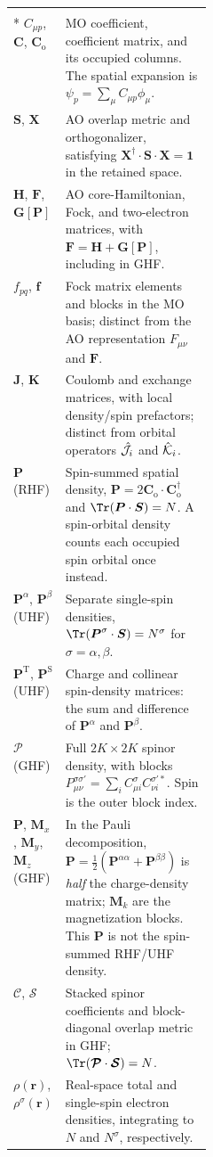 \documentclass[11pt,a4paper,titlepage]{article}
\numberwithin{equation}{section}
\newcommand{\bff}{\boldsymbol{f}}
\newcommand{\br}{\boldsymbol{r}}
\newcommand{\bC}{\boldsymbol{C}}
\newcommand{\bF}{\boldsymbol{F}}
\newcommand{\bG}{\boldsymbol{G}}
\newcommand{\bH}{\boldsymbol{H}}
\newcommand{\bI}{\boldsymbol{1}}
\newcommand{\bJ}{\boldsymbol{J}}
\newcommand{\bK}{\boldsymbol{K}}
\newcommand{\bM}{\boldsymbol{M}}
\newcommand{\bP}{\boldsymbol{P}}
\newcommand{\bS}{\boldsymbol{S}}
\newcommand{\bX}{\boldsymbol{X}}
\newcommand{\chJ}{\Hat{\mathcal{J}}}
\newcommand{\chK}{\Hat{\mathcal{K}}}
\begin{document}
\begin{longtable}{@{}p{0.26\linewidth}p{}@{}}
  \rowcolor{hfGreenLight}
  \multicolumn{2}{@{}l@{}}{\strut\textcolor{hfGreenDark}{\textbf{AO matrices and density normalizations}}}\\*
  $C_{\mu p}$, $\bC$, $\bC_\text{o}$ & MO coefficient, coefficient matrix,
  and its occupied columns. The spatial expansion is
  $\psi_p=\sum_\mu C_{\mu p}\phi_\mu$.\\
  $\bS$, $\bX$ & AO overlap metric and orthogonalizer, satisfying
  $\bX^\dag\cdot\bS\cdot\bX=\bI$ in the retained space.\\
  $\bH$, $\bF$, $\bG[\bP]$ & AO core-Hamiltonian, Fock, and two-electron
  matrices, with $\bF=\bH+\bG[\bP]$, including in GHF.\\
  $f_{pq}$, $\bff$ & Fock matrix elements and blocks in the MO basis;
  distinct from the AO representation $F_{\mu\nu}$ and $\bF$.\\
  $\bJ$, $\bK$ & Coulomb and exchange matrices, with local density/spin
  prefactors; distinct from orbital operators $\chJ_i$ and $\chK_i$.\\
  $\bP$ (RHF) & Spin-summed spatial density,
  $\bP=2\bC_\text{o}\cdot\bC_\text{o}^\dag$ and
  $\Tr(\bP\cdot\bS)=N$. A spin-orbital density counts each occupied
  spin orbital once instead.\\
  $\bP^\alpha$, $\bP^\beta$ (UHF) & Separate single-spin densities,
  $\Tr(\bP^\sigma\cdot\bS)=N^\sigma$ for
  $\sigma=\alpha,\beta$.\\
  $\bP^\text{T}$, $\bP^\text{S}$ (UHF) & Charge and collinear spin-density
  matrices: the sum and difference of $\bP^\alpha$ and $\bP^\beta$.\\
  $\boldsymbol{\mathcal P}$ (GHF) & Full $2K\times2K$ spinor density, with
  blocks $P_{\mu\nu}^{\sigma\sigma'}=\sum_i C_{\mu i}^\sigma
  C_{\nu i}^{\sigma' *}$. Spin is the outer block index.\\
  $\bP$, $\bM_x$, $\bM_y$, $\bM_z$ (GHF) & In the Pauli decomposition,
  $\bP=\tfrac12(\bP^{\alpha\alpha}+\bP^{\beta\beta})$ is
  \emph{half} the charge-density matrix; $\bM_k$ are the magnetization blocks.
  This $\bP$ is not the spin-summed RHF/UHF density.\\
  $\boldsymbol{\mathcal C}$, $\boldsymbol{\mathcal S}$ & Stacked spinor
  coefficients and block-diagonal overlap metric in GHF;
  $\Tr(\boldsymbol{\mathcal P}\cdot\boldsymbol{\mathcal S})=N$.\\
  $\rho(\br)$, $\rho^\sigma(\br)$ & Real-space total and single-spin
  electron densities, integrating to $N$ and $N^\sigma$, respectively.\\


\end{longtable}
\end{document}
